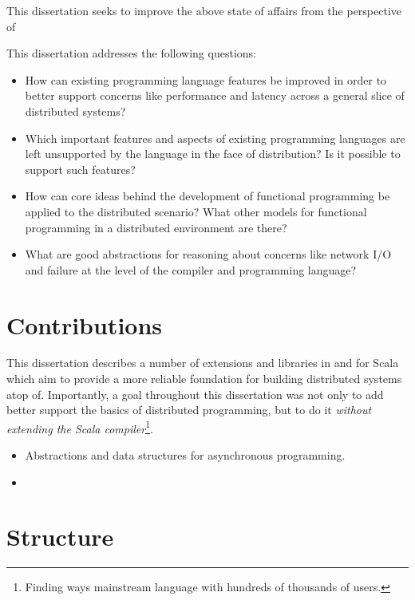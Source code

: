 This dissertation seeks to improve the above state of affairs from the
perspective of

This dissertation addresses the following questions:

\begin{itemize}

	\item How can existing programming language features be improved in order to
	better support concerns like performance and latency across a general slice of
	distributed systems?

	\item Which important features and aspects of existing programming languages
	are left unsupported by the language in the face of distribution? Is it
	possible to support such features?

	\item How can core ideas behind the development of functional programming be
	applied to the distributed scenario? What other models for functional
	programming in a distributed environment are there?

	\item What are good abstractions for reasoning about concerns like network I/O
	and failure at the level of the compiler and programming language?

\end{itemize}

\section{Contributions}

This dissertation describes a number of extensions and libraries in and for
Scala which aim to provide a more reliable foundation for building distributed
systems atop of. Importantly, a goal throughout this dissertation was not only
to add better support the basics of distributed programming, but to do it {\em
without extending the Scala compiler}\footnote{Finding ways mainstream language with
hundreds of thousands of users.}.

\begin{itemize}

	\item Abstractions and data structures for asynchronous programming.

	\item

\end{itemize}

\section{Structure}

